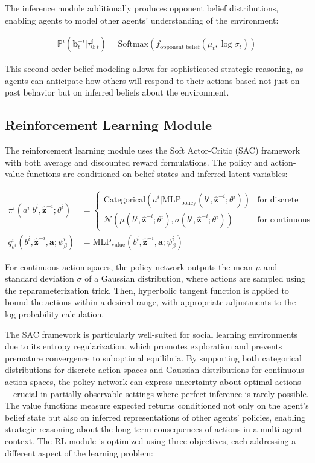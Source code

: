 The inference module additionally produces opponent belief distributions, enabling agents to model other agents' understanding of the environment:

\begin{align}
    \mathbb{P}^i(\boldsymbol{b}^{-i}_t|\tau^i_{0:t}) = \text{Softmax}(f_{\text{opponent\_belief}}(\mu_t, \log\sigma_t))
\end{align}

This second-order belief modeling allows for sophisticated strategic reasoning, as agents can anticipate how others will respond to their actions based not just on past behavior but on inferred beliefs about the environment.

\subsection{Reinforcement Learning Module}

The reinforcement learning module uses the Soft Actor-Critic (SAC) framework with both average and discounted reward formulations. The policy and action-value functions are conditioned on belief states and inferred latent variables:

\begin{align}
    \pi^i(a^i|b^i, \boldsymbol{\hat{z}}^{-i}; \theta^i) &= 
    \begin{cases}
        \text{Categorical}(a^i|\text{MLP}_{\text{policy}}(b^i, \boldsymbol{\hat{z}}^{-i}; \theta^i)) & \text{for discrete actions} \\
        \mathcal{N}(\mu(b^i, \boldsymbol{\hat{z}}^{-i}; \theta^i), \sigma(b^i, \boldsymbol{\hat{z}}^{-i}; \theta^i)) & \text{for continuous actions}
    \end{cases} \\
    q^i_{\theta^i}(b^i, \boldsymbol{\hat{z}}^{-i}, \boldsymbol{a}; \psi^i_{\beta}) &= \text{MLP}_{\text{value}}(b^i, \boldsymbol{\hat{z}}^{-i}, \boldsymbol{a}; \psi^i_{\beta})
\end{align}

For continuous action spaces, the policy network outputs the mean $\mu$ and standard deviation $\sigma$ of a Gaussian distribution, where actions are sampled using the reparameterization trick. Then, hyperbolic tangent function is applied to bound the actions within a desired range, with appropriate adjustments to the log probability calculation.

The SAC framework is particularly well-suited for social learning environments due to its entropy regularization, which promotes exploration and prevents premature convergence to suboptimal equilibria. By supporting both categorical distributions for discrete action spaces and Gaussian distributions for continuous action spaces, the policy network can express uncertainty about optimal actions—crucial in partially observable settings where perfect inference is rarely possible. The value functions measure expected returns conditioned not only on the agent's belief state but also on inferred representations of other agents' policies, enabling strategic reasoning about the long-term consequences of actions in a multi-agent context. The RL module is optimized using three objectives, each addressing a different aspect of the learning problem:

